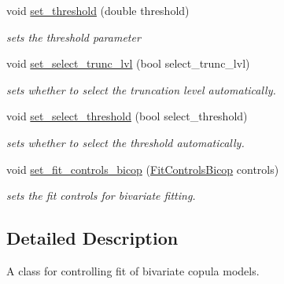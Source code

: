 \begin{Indent}
\begin{DoxyCompactItemize}
void \hyperlink{classvinecopulib_1_1_fit_controls_vinecop_a774ebb065432b9e5f5add91ad3a6b137}{set\+\_\+threshold} (double threshold)
\begin{DoxyCompactList}\small\item\em sets the threshold parameter \end{DoxyCompactList}\item 
\mbox{\label{classvinecopulib_1_1_fit_controls_vinecop_ac6012b793cf0bc620bd1db57c562baf7}} 
void \hyperlink{classvinecopulib_1_1_fit_controls_vinecop_ac6012b793cf0bc620bd1db57c562baf7}{set\+\_\+select\+\_\+trunc\+\_\+lvl} (bool select\+\_\+trunc\+\_\+lvl)
\begin{DoxyCompactList}\small\item\em sets whether to select the truncation level automatically. \end{DoxyCompactList}\item 
\mbox{\label{classvinecopulib_1_1_fit_controls_vinecop_ae07f4c5e566c041d6b2475555313d35f}} 
void \hyperlink{classvinecopulib_1_1_fit_controls_vinecop_ae07f4c5e566c041d6b2475555313d35f}{set\+\_\+select\+\_\+threshold} (bool select\+\_\+threshold)
\begin{DoxyCompactList}\small\item\em sets whether to select the threshold automatically. \end{DoxyCompactList}\item 
\mbox{\label{classvinecopulib_1_1_fit_controls_vinecop_a6ed63d403dc902119ebe0252ada0be47}} 
void \hyperlink{classvinecopulib_1_1_fit_controls_vinecop_a6ed63d403dc902119ebe0252ada0be47}{set\+\_\+fit\+\_\+controls\+\_\+bicop} (\hyperlink{classvinecopulib_1_1_fit_controls_bicop}{Fit\+Controls\+Bicop} controls)
\begin{DoxyCompactList}\small\item\em sets the fit controls for bivariate fitting. \end{DoxyCompactList}\end{DoxyCompactItemize}
\end{Indent}


\subsection{Detailed Description}
A class for controlling fit of bivariate copula models. 


